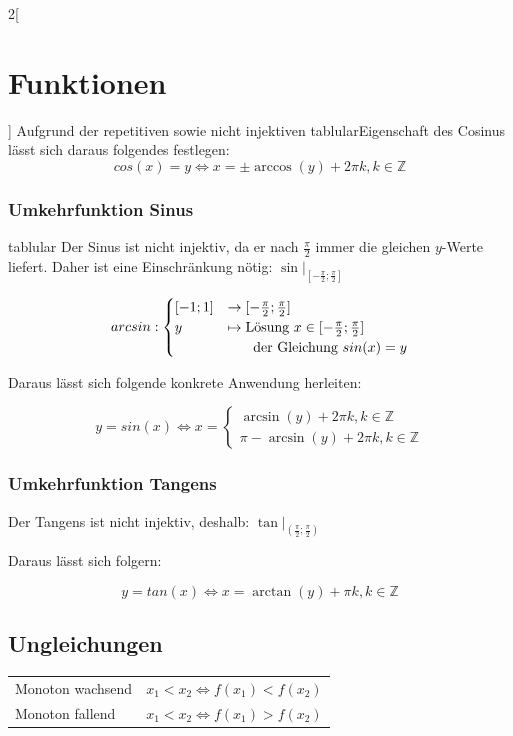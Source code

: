 \begin{multicols}{2}[
	\section{Funktionen}
]
	Aufgrund der repetitiven sowie nicht injektiven tablularEigenschaft des Cosinus lässt sich daraus folgendes festlegen:
	\[
		cos(x) = y \iff x = \pm \arccos(y) + 2 \pi k, k \in \mathbb{Z}
	\]
	
\subsubsection{Umkehrfunktion Sinus}
	tablular
	Der Sinus ist nicht injektiv, da er nach $\frac{\pi}{2}$ immer die gleichen $y$-Werte liefert. Daher ist eine Einschränkung nötig:
	$\sin|_{[-\frac{\pi}{2};\frac{\pi}{2}]}$
	
	\[
		arcsin : \begin{cases}
			[-1;1] &\to [-\frac{\pi}{2};\frac{\pi}{2}]\\
			y &\mapsto \text{Lösung } x \in [-\frac{\pi}{2};\frac{\pi}{2}]\\
			  &\indent \text{ der Gleichung } sin(x)=y
		\end{cases}
	\]
	
	
	Daraus lässt sich folgende konkrete Anwendung herleiten:
	
	\[
		y = sin(x) \iff x = \begin{cases}
			\arcsin(y) + 2 \pi k, k \in \mathbb{Z}\\
			\pi - \arcsin(y) + 2 \pi k, k \in \mathbb{Z}
		\end{cases}
	\]
	
\subsubsection{Umkehrfunktion Tangens}
	
	Der Tangens ist nicht injektiv, deshalb: $\tan|_{(\frac{\pi}{2}; \frac{\pi}{2})}$
	
	Daraus lässt sich folgern:
	
	\[
		y = tan(x) \iff x = \arctan(y) + \pi k, k \in \mathbb{Z}
	\]
	

\subsection{Ungleichungen}

\begin{tabular}{l l}
	Monoton wachsend & $x_1 < x_2 \iff f(x_1) < f(x_2)$ \\
	Monoton fallend & $x_1 < x_2 \iff f(x_1) > f(x_2)$
\end{tabular}

\end{multicols}

